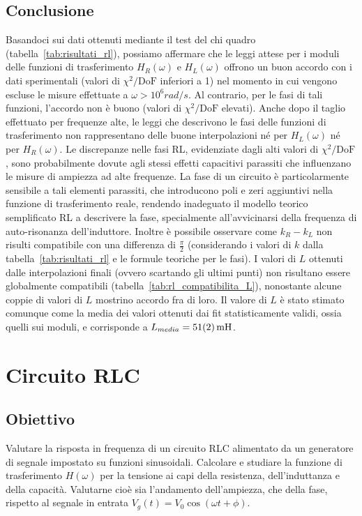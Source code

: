 \documentclass[a4paper]{article}
\begin{document}
\subsection {Conclusione}
Basandoci sui dati ottenuti mediante il test del chi quadro (tabella~\ref{tab:risultati_rl}), possiamo affermare che le leggi attese per i moduli delle funzioni di trasferimento $H_R(\omega)$ e $H_L(\omega)$ offrono un buon accordo con i dati sperimentali (valori di $\chi^2/\text{DoF}$ inferiori a 1) nel momento in cui vengono escluse le misure effettuate a $\omega>10^6 rad/s$. Al contrario, per le fasi di tali funzioni, l'accordo non è buono (valori di $\chi^2/\text{DoF}$ elevati). Anche dopo il taglio effettuato per frequenze alte, le leggi che descrivono le fasi delle funzioni di trasferimento non rappresentano delle buone interpolazioni né per $H_L(\omega)$ né per $H_R(\omega)$. Le discrepanze nelle fasi RL, evidenziate dagli alti valori di $\chi^2/\text{DoF}$, sono probabilmente dovute agli stessi effetti capacitivi parassiti che influenzano le misure di ampiezza ad alte frequenze. La fase di un circuito è particolarmente sensibile a tali elementi parassiti, che introducono poli e zeri aggiuntivi nella funzione di trasferimento reale, rendendo inadeguato il modello teorico semplificato RL a descrivere la fase, specialmente all'avvicinarsi della frequenza di auto-risonanza dell'induttore.
Inoltre è possibile osservare come $k_R - k_L$ non risulti compatibile con una differenza di $\frac{\pi}{2}$ (considerando i valori di $k$ dalla tabella~\ref{tab:risultati_rl} e le formule teoriche per le fasi).
I valori di $L$ ottenuti dalle interpolazioni finali (ovvero scartando gli ultimi punti) non risultano essere globalmente compatibili (tabella~\ref{tab:rl_compatibilita_L}), nonostante alcune coppie di valori di $L$ mostrino accordo fra di loro. Il valore di $L$ è stato stimato comunque come la media dei valori ottenuti dai fit statisticamente validi, ossia quelli sui moduli, e corrisponde a $L_{media} = \SI{51 \pm 2}{mH}$.


\section{Circuito RLC}
\subsection{Obiettivo}
Valutare la risposta in frequenza di un circuito RLC alimentato da un generatore di segnale impostato su funzioni sinusoidali. Calcolare e studiare la funzione di trasferimento $H(\omega)$ per la tensione ai capi della resistenza, dell'induttanza e della capacità. Valutarne cioè sia l’andamento dell’ampiezza, che della fase, rispetto al segnale in entrata $V_g(t) = V_{0} \cos(\omega t + \phi)$.
\end{document}
